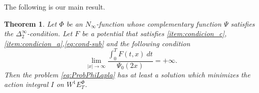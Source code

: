 \documentclass[twoside]{article}
\newtheorem{thm}{Theorem}[section]
\theoremstyle{remark}
\newcommand{\ephi}{E^{\Phi}}
\newcommand{\wphie}{W^{1}\ephi}
\begin{document}
The following is our main result. 




\begin{thm}\label{coercitividad-r}
  Let $\Phi$ be an $N_{\infty}$-function whose complementary function $\Psi$ satisfies the $\Delta_2^{\infty}$-condition. Let $F$ be a potential that satisfies \ref{item:condicion_c}, \ref{item:condicion_a},\eqref{eq:cond-sub} and the following condition
\begin{equation}\label{eq:propiedad-coercividad-phi0}
\lim_{|x|\to\infty}\frac{\int_{0}^{T}F(t,x)\ dt}{\Psi_0(2x)}=+\infty.
\end{equation}
Then the problem \eqref{eq:ProbPhiLapla} has at least a solution which minimizes the action integral $I$ on $\wphie_T$.
\end{thm}
\end{document}
